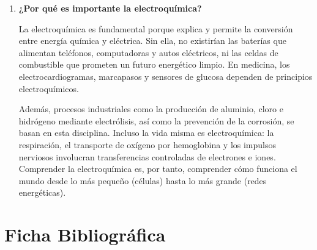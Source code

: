 \documentclass[12pt]{article}
\begin{document}
\begin{enumerate}[label=\textbf{\alph*)}, leftmargin=1.2cm]
    \item \textbf{¿Por qué es importante la electroquímica?}

    La electroquímica es fundamental porque explica y permite la conversión
    entre energía química y eléctrica. Sin ella, no existirían las baterías que
    alimentan teléfonos, computadoras y autos eléctricos, ni las celdas de
    combustible que prometen un futuro energético limpio. En medicina, los
    electrocardiogramas, marcapasos y sensores de glucosa dependen de
    principios electroquímicos.

    Además, procesos industriales como la producción de aluminio, cloro e
    hidrógeno mediante electrólisis, así como la prevención de la corrosión,
    se basan en esta disciplina. Incluso la vida misma es electroquímica: la
    respiración, el transporte de oxígeno por hemoglobina y los impulsos
    nerviosos involucran transferencias controladas de electrones e iones.
    Comprender la electroquímica es, por tanto, comprender cómo funciona el
    mundo desde lo más pequeño (células) hasta lo más grande (redes
    energéticas).

\end{enumerate}

\section{Ficha Bibliográfica}
\end{document}
